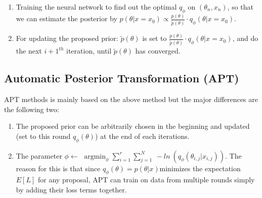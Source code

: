 \documentclass{article}
\begin{document}
\begin{enumerate}[Step 1:]
\item Training the neural network to find out the optimal $q_\phi$ on $ (\theta_n,x_n)$, so that we can estimate the posterior by $p(\theta|x=x_0) \propto \frac{p(\theta)}{\tilde{p}(\theta)}\cdot q_\phi(\theta|x=x_0)$.
\item For updating the proposed prior: $\tilde{p}(\theta)$ is set to $\frac{p(\theta)}{\tilde{p}(\theta)}\cdot q_\phi(\theta|x=x_0)$, and do the next $i+1^{th}$ iteration, until $\tilde{p}(\theta)$ has converged.
\end{enumerate}

\subsection{Automatic Posterior Transformation (APT)}
APT methods is mainly based on the above method but the major differences are the following two:

\begin{enumerate}[1.]
\item The proposed prior can be arbitrarily chosen in the beginning and updated (set to this round $q_{\phi}(\theta)$) at the end of each iterations.
\item The parameter $\phi \leftarrow$
$\mathop{\arg\min}_{\phi}  \sum_{i=1}^{r} \sum_{j=1}^{N} \ - ln \  ( q_\phi(\theta_{i,j}|x_{i,j}) )$. The reason for this is that since $q_{\phi}(\theta)=  p(\theta|x) $minimizes the expectation $E[L]$ for any proposal, APT can train on data from multiple rounds simply by adding their loss terms together.


\end{enumerate}
\end{document}
